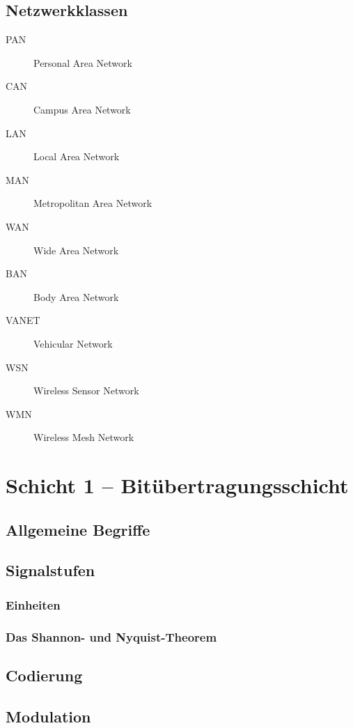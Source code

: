 \documentclass[a4paper,10pt]{scrartcl}
\begin{document}
\subsection{Netzwerkklassen}
\begin{description}
\item[PAN]   Personal Area Network
\item[CAN]   Campus Area Network
\item[LAN]   Local Area Network
\item[MAN]   Metropolitan Area Network
\item[WAN]   Wide Area Network \\
\hrulefill
\item[BAN]   Body Area Network
\item[VANET] Vehicular Network
\item[WSN]   Wireless Sensor Network
\item[WMN]   Wireless Mesh Network
\end{description}

\section{Schicht 1 -- Bitübertragungsschicht}
\subsection{Allgemeine Begriffe}
\subsection{Signalstufen}
\subsubsection{Einheiten}
\subsubsection{Das Shannon- und Nyquist-Theorem}
\subsection{Codierung}
\subsection{Modulation}
\end{document}
